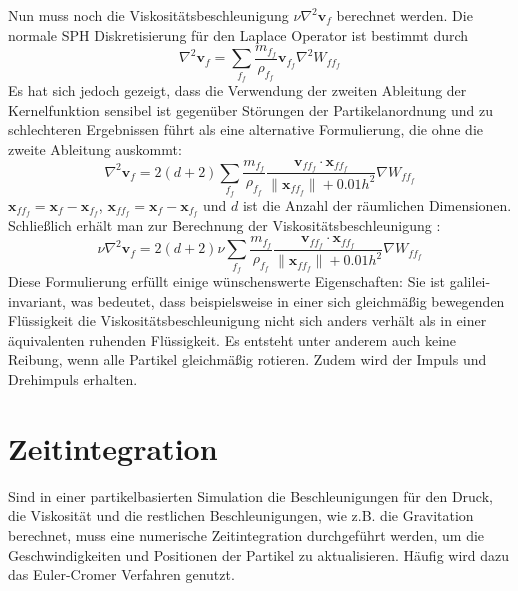 \documentclass[11pt,
a4paper,
parskip=half, %
BCOR=10mm, %
english,
ngerman]{scrreprt}
\begin{document}
Nun muss noch die Viskositätsbeschleunigung $\nu \nabla^2 \textbf{v}_f$ berechnet werden.
Die normale SPH Diskretisierung für den Laplace Operator ist bestimmt durch
\begin{equation}
    \nabla^2 \textbf{v}_f = \sum_{f_f} \frac{m_{f_f}}{\rho_{f_f}} \textbf{v}_{f_f} \nabla^2 W_{ff_f}
\end{equation}
Es hat sich jedoch gezeigt,
dass die Verwendung der zweiten Ableitung der Kernelfunktion sensibel ist gegenüber Störungen der Partikelanordnung
und zu schlechteren Ergebnissen führt als eine alternative Formulierung, die ohne die zweite Ableitung auskommt:
\begin{equation}
    \nabla^2 \textbf{v}_f = 2(d + 2) \sum_{f_f} \frac{m_{f_f}}{\rho_{f_f}} \frac{\textbf{v}_{ff_f} \cdot \textbf{x}_{ff_f}}{\|\textbf{x}_{ff_f}\| + 
    0.01h^2} \nabla W_{ff_f}
\end{equation}
$\textbf{x}_{ff_f} = \textbf{x}_f - \textbf{x}_{f_f}$, $\textbf{x}_{ff_f} = \textbf{x}_f - \textbf{x}_{f_f}$ und $d$ ist die Anzahl der räumlichen Dimensionen.
Schließlich erhält man zur Berechnung der Viskositätsbeschleunigung \cite{koschier_smoothed_2020}:
\begin{equation}
    \nu \nabla^2 \textbf{v}_f = 2(d + 2) \nu \sum_{f_f} \frac{m_{f_f}}{\rho_{f_f}} \frac{\textbf{v}_{ff_f} \cdot \textbf{x}_{ff_f}}{\|\textbf{x}_{ff_f}\| + 
    0.01h^2} \nabla W_{ff_f}
\end{equation}
Diese Formulierung erfüllt einige wünschenswerte Eigenschaften:
Sie ist galilei-invariant, was bedeutet, dass beispielsweise in einer sich gleichmäßig bewegenden Flüssigkeit
die Viskositätsbeschleunigung nicht sich anders verhält als in einer äquivalenten ruhenden Flüssigkeit.
Es entsteht unter anderem auch keine Reibung, wenn alle Partikel gleichmäßig rotieren.
Zudem wird der Impuls und Drehimpuls erhalten.


\section{Zeitintegration}
Sind in einer partikelbasierten Simulation die Beschleunigungen für den Druck, die Viskosität und die restlichen Beschleunigungen, wie z.B. die Gravitation berechnet,
muss eine numerische Zeitintegration durchgeführt werden, um die Geschwindigkeiten und Positionen der Partikel zu aktualisieren.
Häufig wird dazu das Euler-Cromer Verfahren genutzt. \cite{koschier_smoothed_2020}
\end{document}
